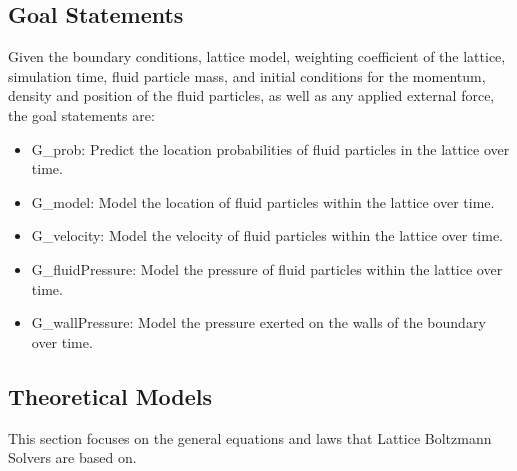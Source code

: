 \documentclass[12pt]{article}
\newcommand{\famname}{Lattice Boltzmann Solvers} %
\begin{document}
\subsection{Goal Statements}
\label{goalstatements}
\noindent Given the boundary conditions, lattice model, weighting coefficient of the lattice, simulation time, fluid particle mass, and initial conditions for the momentum, density and position of the fluid particles, as well as any applied external force, the goal statements are:

\begin{itemize}

\item[\label{G_Probability}]G\_prob: Predict the location probabilities of fluid particles in the lattice over time.

\item[\label{G_Model}]G\_model: Model the location of fluid particles within the lattice over time.

\item[\label{G_Velocity}]G\_velocity: Model the velocity of fluid particles within the lattice over time.

\item[\label{G_FluidPressure}]G\_fluidPressure: Model the pressure of fluid particles within the lattice over time.

\item[\label{G_WallPressure}]G\_wallPressure: Model the pressure exerted on the walls of the boundary over time.

\end{itemize}

\subsection{Theoretical Models} \label{sec_theoretical}

This section focuses on the general equations and laws that \famname{} are based
on.  

~\newline
\end{document}

